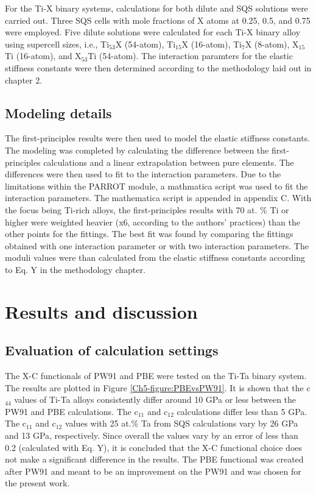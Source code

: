 For the Ti-X binary systems, calculations for both dilute and SQS solutions were carried out. Three SQS cells with mole fractions of X atoms at 0.25, 0.5, and 0.75 were employed. Five dilute solutions were calculated for each Ti-X binary alloy using supercell sizes, i.e., Ti$_{53}$X (54-atom), Ti$_{15}$X (16-atom), Ti$_{7}$X (8-atom), X$_{15}$Ti (16-atom), and X$_{53}$Ti (54-atom). The interaction paramters for the  elastic stiffness constants were then determined according to the methodology laid out in chapter 2. 

\subsection{Modeling details}

  The first-principles results were then used to model the elastic stiffness constants. The modeling was completed by calculating the difference between the first-principles calculations and a linear extrapolation between pure elements. The differences were then used to fit to the interaction parameters. Due to the limitations within the PARROT module, a mathmatica script was used to fit the interaction parameters. The mathematica script is appended in appendix C. With the focus being Ti-rich alloys, the first-principles results with 70 at. \% Ti or higher were weighted heavier (x6, according to the authors' practices) than the other points for the fittings. The best fit was found by comparing the fittings obtained with one interaction parameter or with two interaction parameters. The moduli values were than calculated from the elastic stiffness constants according to Eq. Y in the methodology chapter.

\section{Results and discussion}

\subsection{Evaluation of calculation settings}

The X-C functionals of PW91 and PBE were tested on the Ti-Ta binary system. The results are plotted in Figure \ref{Ch5-figure:PBEvsPW91}. It is shown that the c$_{44}$ values of Ti-Ta alloys consistently differ around 10 GPa or less between the PW91 and PBE calculations. The c$_{11}$ and c$_{12}$ calculations differ less than 5 GPa. The c$_{11}$ and c$_{12}$ values with 25 at.$\%$ Ta from SQS calculations vary by 26 GPa and 13 GPa, respectively. Since overall the values vary by an error of less than 0.2 (calculated with Eq. Y), it is concluded that the X-C functional choice does not make a significant difference in the results. The PBE functional was created after PW91 and meant to be an improvement on the PW91 and was chosen for the present work. 

